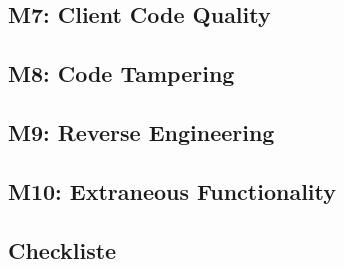 \subsection{M7: Client Code Quality}

\subsection{M8: Code Tampering}

\subsection{M9: Reverse Engineering}

\subsection{M10: Extraneous Functionality}
\subsection{Checkliste}

